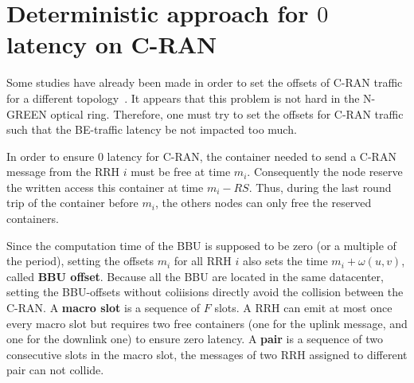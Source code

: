 \documentclass[]{algotel}
\newcommand{\todo}[1]{{\color{red} TODO: {#1}}}
\begin{document}
%  
%
%
%  


  \section{Deterministic approach for $0$ latency on C-RAN}
\label{sec:deterministicalgorithms}

Some studies have already been made in order to set the offsets of C-RAN traffic for a different topology~\cite{dominique2018deterministic}. It appears that this problem is not hard in the N-GREEN optical ring. Therefore, one must try to set the offsets for C-RAN traffic such that the BE-traffic latency be not impacted too much.

In order to ensure $0$ latency for C-RAN, the container needed to send a C-RAN message from the RRH $i$ must be free at time $m_i$. Consequently the node reserve the written access this container at time $m_i - RS$. Thus, during the last round trip of the container before $m_i$, the others nodes can only free the reserved containers.

Since the computation time of the BBU is supposed to be zero (or a multiple of the period), setting the offsets $m_i$ for all RRH $i$ also sets the time $m_i + \omega(u,v)$, called {\bf BBU offset}. Because all the BBU are located in the same datacenter, setting the BBU-offsets without coliisions directly avoid the collision between the C-RAN. A {\bf macro slot} is a sequence of $F$ slots. A RRH can emit at most once every macro slot but requires two free containers (one for the uplink message, and one for the downlink one) to ensure zero latency. A {\bf pair} is a sequence of two consecutive slots in the macro slot, the messages of two RRH assigned to different pair can not collide.
\end{document}
